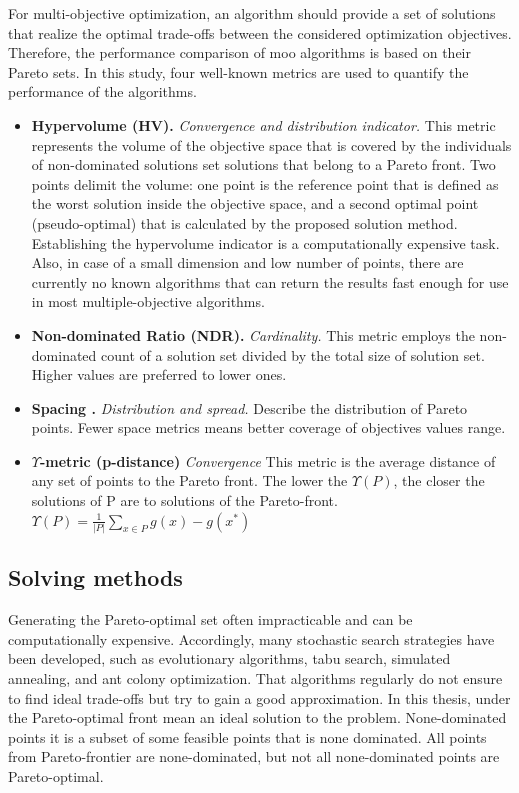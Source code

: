             For multi-objective optimization, an algorithm should provide a set of solutions that realize the optimal trade-offs between the considered optimization objectives. Therefore, the performance comparison of \gls{moo} algorithms is based on their Pareto sets. In this study, four well-known metrics are used to quantify the performance of the algorithms.
            \begin{itemize}
                \item \textbf{Hypervolume (HV).}\cite{Zitzler2000ComparisonOM} \textit{Convergence and distribution indicator.}
                This metric represents the volume of the objective space that is covered by the individuals of non-dominated solutions set solutions that belong to a Pareto front. Two points delimit the volume: one point is the reference point that is defined as the worst solution inside the objective space, and a second optimal point (pseudo-optimal) that is calculated by the proposed solution method. Establishing the hypervolume indicator is a computationally expensive task. Also, in case of a small dimension and low number of points, there are currently no known algorithms that can return the results fast enough for use in most multiple-objective algorithms.  
                \item \textbf{Non-dominated Ratio (NDR).} \textit{Cardinality.} This metric employs the non-dominated count of a solution set divided by the total size of solution set. Higher values are preferred to lower ones.
                \item \textbf{Spacing \cite{Schott1995FaultTD}.} \textit{Distribution and spread.} Describe the distribution of Pareto points. Fewer space metrics means better coverage of objectives values range. 
                \item \textbf{$\Upsilon$-metric (p-distance)}\cite{Martens13} \textit{Convergence} This metric is the average distance of any set of points to the Pareto front. The lower the $\Upsilon (P)$, the closer the solutions of P are to solutions of the Pareto-front. $\Upsilon(P) = \frac{1}{|P|}\sum_{x\in P}g(x)-g(x^*)$  
            \end{itemize}
 
        \subsection{Solving methods}
            Generating the Pareto-optimal set often impracticable and can be computationally expensive. Accordingly, many stochastic search strategies have been developed, such as evolutionary algorithms, tabu search, simulated annealing, and ant colony optimization. That algorithms regularly do not ensure to find ideal trade-offs but try to gain a good approximation.
            In this thesis, under the Pareto-optimal front mean an ideal solution to the problem. None-dominated points it is a subset of some feasible points that is none dominated. All points from Pareto-frontier are none-dominated, but not all none-dominated points are Pareto-optimal.

